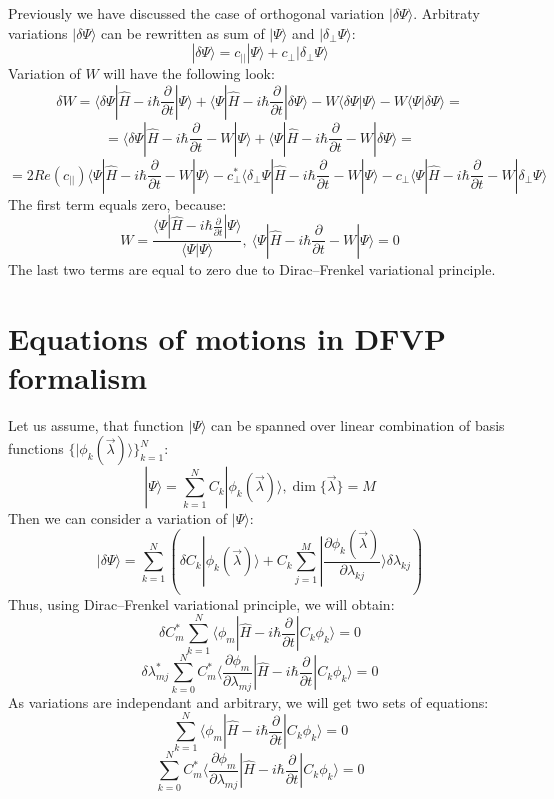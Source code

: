 \documentclass[a4paper,14pt]{extarticle}
\begin{document}
Previously we have discussed the case of orthogonal variation $|\delta\Psi\rangle$. 
Arbitraty variations $|\delta\Psi\rangle$ can be rewritten as sum of $|\Psi\rangle$ and $|\delta_{\perp}\Psi\rangle$:
$$|\delta\Psi\rangle = c_{||}|\Psi\rangle + c_{\perp}|\delta_{\perp}\Psi\rangle$$
Variation of $W$ will have the following look:
$$\delta W = \langle\delta\Psi|\hat{H}-i\hbar\frac{\partial}{\partial t}|\Psi\rangle + %
	     \langle\Psi|\hat{H}-i\hbar\frac{\partial}{\partial t}|\delta\Psi\rangle - 
	     W\langle\delta\Psi|\Psi\rangle - W\langle\Psi|\delta\Psi\rangle = $$
$$ = \langle\delta\Psi|\hat{H}-i\hbar\frac{\partial}{\partial t}-W|\Psi\rangle + %
     \langle\Psi|\hat{H}-i\hbar\frac{\partial}{\partial t}-W|\delta\Psi\rangle = $$
$$ = 2\mathit{Re}(c_{||})\langle\Psi|\hat{H}-i\hbar\frac{\partial}{\partial t}-W|\Psi\rangle - %
     c_{\perp}^*\langle\delta_{\perp}\Psi|\hat{H}-i\hbar\frac{\partial}{\partial t}-W|\Psi\rangle - %
     c_{\perp}\langle\Psi|\hat{H}-i\hbar\frac{\partial}{\partial t}-W|\delta_{\perp}\Psi\rangle $$
The first term equals zero, because:
$$W = \frac{\langle\Psi|\hat{H}-i\hbar\frac{\partial}{\partial t}|\Psi\rangle}{\langle\Psi|\Psi\rangle},\ %
      \langle\Psi|\hat{H}-i\hbar\frac{\partial}{\partial t}-W|\Psi\rangle = 0$$
The last two terms are equal to zero due to Dirac--Frenkel variational principle.

\section{Equations of motions in DFVP formalism}
Let us assume, that function $|\Psi\rangle$ can be spanned over linear combination of basis functions $\{|\phi_k(\vec{\lambda})\rangle\}_{k=1}^N$:
$$|\Psi\rangle = \sum_{k=1}^NC_k|\phi_k(\vec{\lambda})\rangle, \dim\{\vec{\lambda}\} = M$$
Then we can consider a variation of $|\Psi\rangle$:
$$|\delta\Psi\rangle = \sum_{k=1}^N \left( \delta C_k|\phi_k(\vec{\lambda})\rangle + %
					   C_k\sum_{j=1}^M|\frac{\partial\phi_k(\vec{\lambda})}{\partial\lambda_{kj}}\rangle\delta\lambda_{kj} \right)$$
Thus, using Dirac--Frenkel variational principle, we will obtain:
$$\delta C_m^*\sum_{k=1}^N\langle\phi_m|\hat{H}-i\hbar\frac{\partial}{\partial t}|C_k\phi_k\rangle=0$$
$$\delta\lambda_{mj}^*\sum_{k=0}^NC_m^*\langle\frac{\partial\phi_m}{\partial\lambda_{mj}}|\hat{H}-i\hbar\frac{\partial}{\partial t}|C_k\phi_k\rangle = 0$$
As variations are independant and arbitrary, we will get two sets of equations:
$$\sum_{k=1}^N\langle\phi_m|\hat{H}-i\hbar\frac{\partial}{\partial t}|C_k\phi_k\rangle=0$$
$$\sum_{k=0}^NC_m^*\langle\frac{\partial\phi_m}{\partial\lambda_{mj}}|\hat{H}-i\hbar\frac{\partial}{\partial t}|C_k\phi_k\rangle = 0$$
\end{document}
